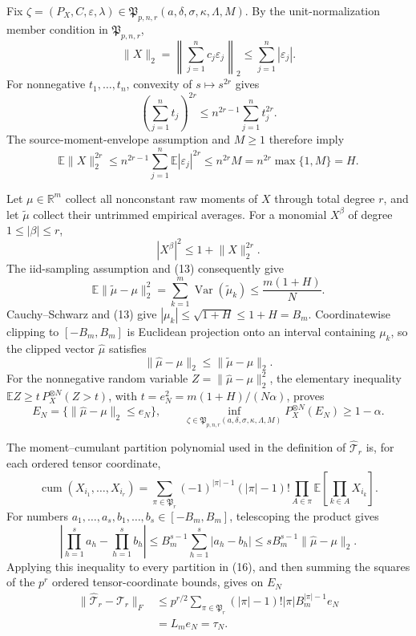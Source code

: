 Fix \(\zeta=(P_X,C,\varepsilon,\lambda)\in\mathfrak P_{p,n,r}(a,\delta,\sigma,\kappa,\Lambda,M)\). By the unit-normalization member condition in \(\mathfrak P_{p,n,r}\),
\[
 \lVert X\rVert_2
 =\left\lVert\sum_{j=1}^nc_j\varepsilon_j\right\rVert_2
 \le\sum_{j=1}^n|\varepsilon_j|.
\]
For nonnegative \(t_1,\ldots,t_n\), convexity of \(s\mapsto s^{2r}\) gives
\[
 \left(\sum_{j=1}^nt_j\right)^{2r}
 \le n^{2r-1}\sum_{j=1}^nt_j^{2r}.
\]
The source-moment-envelope assumption and \(M\ge1\) therefore imply
\[
 \mathbb E\lVert X\rVert_2^{2r}
 \le n^{2r-1}\sum_{j=1}^n\mathbb E|\varepsilon_j|^{2r}
 \le n^{2r}M
 =n^{2r}\max\{1,M\}=H.
 \tag{13}
\]

Let \(\mu\in\mathbb R^m\) collect all nonconstant raw moments of \(X\) through total degree \(r\), and let \(\widetilde\mu\) collect their untrimmed empirical averages. For a monomial \(X^\beta\) of degree \(1\le|\beta|\le r\),
\[
 |X^\beta|^2\le1+\lVert X\rVert_2^{2r}.
\]
The iid-sampling assumption and (13) consequently give
\[
 \mathbb E\lVert\widetilde\mu-\mu\rVert_2^2
 =\sum_{k=1}^m\operatorname{Var}(\widetilde\mu_k)
 \le\frac{m(1+H)}N.
 \tag{14}
\]
Cauchy--Schwarz and (13) give \(|\mu_k|\le\sqrt{1+H}\le1+H=B_m\). Coordinatewise clipping to \([-B_m,B_m]\) is Euclidean projection onto an interval containing \(\mu_k\), so the clipped vector \(\widehat\mu\) satisfies
\[
 \lVert\widehat\mu-\mu\rVert_2
 \le\lVert\widetilde\mu-\mu\rVert_2.
\]
For the nonnegative random variable \(Z=\lVert\widehat\mu-\mu\rVert_2^2\), the elementary inequality \(\mathbb EZ\ge t\,P_X^{\otimes N}(Z>t)\), with \(t=e_N^2=m(1+H)/(N\alpha)\), proves
\[
 E_N=\{\lVert\widehat\mu-\mu\rVert_2\le e_N\},
 \qquad
 \inf_{\zeta\in\mathfrak P_{p,n,r}(a,\delta,\sigma,\kappa,\Lambda,M)}
 P_X^{\otimes N}(E_N)\ge1-\alpha.
 \tag{15}
\]

The moment--cumulant partition polynomial used in the definition of \(\widehat{\mathcal T}_r\) is, for each ordered tensor coordinate,
\[
 \operatorname{cum}(X_{i_1},\ldots,X_{i_r})
 =\sum_{\pi\in\mathfrak P_r}(-1)^{|\pi|-1}(|\pi|-1)!
 \prod_{A\in\pi}\mathbb E\!\left[\prod_{k\in A}X_{i_k}\right].
 \tag{16}
\]
For numbers \(a_1,\ldots,a_s,b_1,\ldots,b_s\in[-B_m,B_m]\), telescoping the product gives
\[
 \left|\prod_{h=1}^sa_h-\prod_{h=1}^sb_h\right|
 \le B_m^{s-1}\sum_{h=1}^s|a_h-b_h|
 \le sB_m^{s-1}\lVert\widehat\mu-\mu\rVert_2.
\]
Applying this inequality to every partition in (16), and then summing the squares of the \(p^r\) ordered tensor-coordinate bounds, gives on \(E_N\)
\[
 \begin{aligned}
 \lVert\widehat{\mathcal T}_r-\mathcal T_r\rVert_F
 &\le p^{r/2}
 \sum_{\pi\in\mathfrak P_r}(|\pi|-1)!|\pi|B_m^{|\pi|-1}e_N\\
 &=L_me_N=\tau_N.
 \end{aligned}
 \tag{17}
\]


